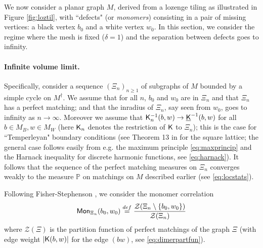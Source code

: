 \documentclass[10pt]{article}
\newcommand{\mc}{\mathcal}
\renewcommand{\P}{\mathbb{P}}
\newcommand{\rK}{{\sf K}}
\newcommand{\uK}{{\underline {\sf K}}}
\newcommand{\dg}{\dagger}
\newcommand{\Mon}{{\sf Mon}}
\begin{document}
We now consider a planar graph $M$, derived from a lozenge tiling as illustrated in Figure \ref{fig:loztil}, with ``defects" (or {\em monomers}) consisting in a pair of missing vertices: a black vertex $b_0$ and a white vertex $w_0$. In this section, we consider the regime where the mesh is fixed ($\delta=1$) and the separation between defects goes to infinity.

\paragraph{Infinite volume limit.\\}
Specifically, consider a sequence $(\Xi_n)_{n\geq 1}$ of subgraphs of $M$ bounded by a simple cycle on $M^\dg$. We assume that for all $n$, $b_0$ and $w_0$ are in $\Xi_n$ and that $\Xi_n$ has a perfect matching; and that the inradius of $\Xi_n$, say seen from $w_0$, goes to infinity as $n\rightarrow\infty$. Moreover we assume that $\rK^{-1}_n(b,w)\rightarrow \uK^{-1}(b,w)$ for all $b\in M_B,w\in M_W$ (here $\rK_n$ denotes the restriction of $\rK$ to $\Xi_n$); this is the case for ``Temperleyan" boundary conditions (see Theorem 13 in \cite{Ken_domino_conformal} for the square lattice; the general case follows easily from e.g. the maximum principle \eqref{eq:maxprincip} and the Harnack inequality for discrete harmonic functions, see \eqref{eq:harnack}). It follows that the sequence of the perfect matching measures on $\Xi_n$ converges weakly to the measure $\P$ on matchings on $M$ described earlier (see \eqref{eq:locstats}). 
%
%

Following Fisher-Stephenson \cite{FisSte2}, we consider the monomer correlation 
$$\Mon_{\Xi_n}(b_0,w_0)\stackrel{def}{=}\frac{{\mc Z}(\Xi_n\setminus\{b_0,w_0\})}{{\mc Z}(\Xi_n)}$$
where ${\mc Z}(\Xi)$ is the partition function of perfect matchings of the graph $\Xi$ (with edge weight $|\rK(b,w)|$ for the edge $(bw)$, see \eqref{eq:dimerpartfun}). 
\end{document}
